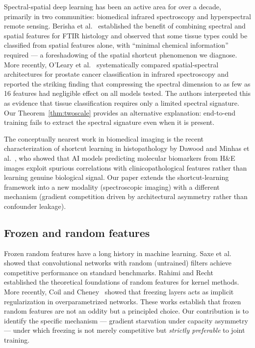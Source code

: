 Spectral-spatial deep learning has been an active area for over a
decade, primarily in two communities: biomedical infrared spectroscopy
and hyperspectral remote sensing. Berisha et al.~\cite{berisha2019deep}
established the benefit of combining spectral and spatial features for
FTIR histology and observed that some tissue types could be classified
from spatial features alone, with ``minimal chemical information''
required --- a foreshadowing of the spatial shortcut phenomenon we
diagnose. More recently, O'Leary et
al.~\cite{oleary2026spatial} systematically compared spatial-spectral
architectures for prostate cancer classification in infrared
spectroscopy and reported the striking finding that compressing the
spectral dimension to as few as 16 features had negligible effect on
all models tested. The authors interpreted this as evidence that
tissue classification requires only a limited spectral signature.
Our Theorem~\ref{thm:twoscale} provides an alternative explanation:
end-to-end training fails to extract the spectral signature even when
it is present.

The conceptually nearest work in biomedical imaging is the recent
characterization of shortcut learning in histopathology by Dawood and
Minhas et al.~\cite{dawood2026confounding}, who showed that AI models
predicting molecular biomarkers from H\&E images exploit spurious
correlations with clinicopathological features rather than learning
genuine biological signal. Our paper extends the shortcut-learning
framework into a new modality (spectroscopic imaging) with a different
mechanism (gradient competition driven by architectural asymmetry
rather than confounder leakage).

\subsection{Frozen and random features}

Frozen random features have a long history in machine learning. Saxe
et al.~\cite{saxe2011random} showed that convolutional networks with
random (untrained) filters achieve competitive performance on standard
benchmarks. Rahimi and Recht~\cite{rahimi2007random} established the
theoretical foundations of random features for kernel methods. More
recently, Coil and Cheney~\cite{coil2025freezing} showed that freezing
layers acts as implicit regularization in overparametrized networks.
These works establish that frozen random features are not an oddity
but a principled choice. Our contribution is to identify the specific
mechanism --- gradient starvation under capacity asymmetry --- under
which freezing is not merely competitive but \emph{strictly preferable}
to joint training.
